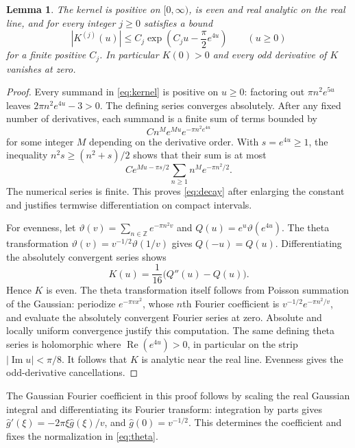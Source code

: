 \documentclass[11pt]{article}
\newtheorem{lemma}[theorem]{Lemma}
\theoremstyle{remark}\newtheorem{remark}[theorem]{Remark}
\begin{document}
\begin{lemma}\label{lem:kernel}
The kernel is positive on $[0,\infty)$, is even and real analytic
on the real line, and for every integer $j\geq0$ satisfies a bound
\begin{equation}\label{eq:decay}
 |K^{(j)}(u)|\leq C_j\exp\left(C_j u-\frac\pi2 e^{4u}\right)
 \qquad(u\geq0)
\end{equation}
for a finite positive $C_j$. In particular $K(0)>0$ and every odd
derivative of $K$ vanishes at zero.
\end{lemma}
\begin{proof}
Every summand in \eqref{eq:kernel} is positive on $u\geq0$:
factoring out $\pi n^2e^{5u}$ leaves $2\pi n^2e^{4u}-3>0$.
The defining series converges absolutely. After any fixed number
of derivatives, each summand is a finite sum of terms bounded by
\[
 C n^M e^{Mu}e^{-\pi n^2e^{4u}}
\]
for some integer $M$ depending on the derivative order. With
$s=e^{4u}\geq1$, the inequality
$n^2s\geq(n^2+s)/2$ shows that their sum is at most
\[
 C e^{Mu-\pi s/2}\sum_{n\geq1}n^M e^{-\pi n^2/2}.
\]
The numerical series is finite. This proves \eqref{eq:decay} after
enlarging the constant and justifies termwise differentiation on
compact intervals.

For evenness, let $\vartheta(v)=\sum_{n\in\mathbb Z}e^{-\pi n^2v}$
and $Q(u)=e^u\vartheta(e^{4u})$. The theta transformation
$\vartheta(v)=v^{-1/2}\vartheta(1/v)$ gives $Q(-u)=Q(u)$.
Differentiating the absolutely convergent series shows
\begin{equation}\label{eq:theta}
 K(u)=\frac1{16}\big(Q''(u)-Q(u)\big).
\end{equation}
Hence $K$ is even. The theta transformation itself follows from
Poisson summation of the Gaussian: periodize $e^{-\pi v x^2}$,
whose $n$th Fourier coefficient is $v^{-1/2}e^{-\pi n^2/v}$,
and evaluate the absolutely convergent Fourier series at zero.
Absolute and locally uniform convergence justify this computation.
The same defining theta series is holomorphic where
$\operatorname{Re}(e^{4u})>0$, in particular on the strip
$|\operatorname{Im}u|<\pi/8$. It follows that $K$ is analytic near
the real line. Evenness gives the odd-derivative cancellations.
\end{proof}

The Gaussian Fourier coefficient in this proof follows by scaling
the real Gaussian integral and differentiating its Fourier transform:
integration by parts gives $\widehat g'(\xi)=-2\pi\xi\widehat g(\xi)/v$,
and $\widehat g(0)=v^{-1/2}$. This determines the coefficient and
fixes the normalization in \eqref{eq:theta}.
\end{document}
